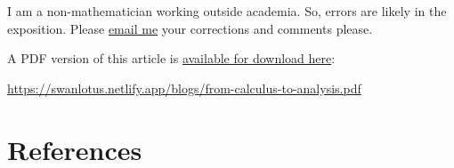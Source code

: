 \documentclass[
  a4paper,
]{article}
\begin{document}
I am a non-mathematician working outside academia. So, errors are likely
in the exposition. Please
\href{mailto:feedback.swanlotus@gmail.com}{email me} your corrections
and comments please.

\noindent A PDF version of this article is
\href{./from-calculus-to-analysis.pdf}{available for download here}:

\begin{small}

\begin{sffamily}

\url{https://swanlotus.netlify.app/blogs/from-calculus-to-analysis.pdf}

\end{sffamily}

\end{small}

\section*{References}\label{bibliography}
\end{document}
